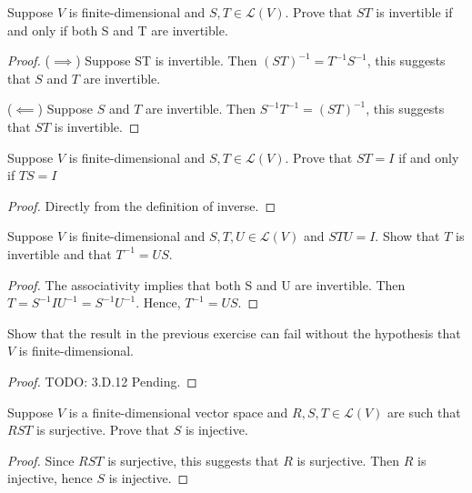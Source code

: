 \begin{exercise}
Suppose $V$ is finite-dimensional and $S,T \in \mathcal{L}(V).$ Prove that $ST $ is invertible if and only if both S and T are invertible.
\end{exercise}
\begin{proof}
	($\implies$) Suppose ST is invertible. Then $(ST)^{-1} = T^{-1}S^{-1}$, this suggests that $S$ and $T$ are invertible.

	($\impliedby$) Suppose $S$ and $T$ are invertible. Then $S^{-1}T^{-1} = (ST)^{-1}$, this suggests that $ST$ is invertible.
\end{proof}

\begin{exercise}
Suppose $V$ is finite-dimensional and $S,T \in \mathcal{L}(V)$. Prove that $ST = I$ if and only if $TS = I$
\end{exercise}
\begin{proof}
	Directly from the definition of inverse.
\end{proof}

\begin{exercise}
Suppose $V$ is finite-dimensional and $S,T,U \in \mathcal{L}(V)$ and $STU = I.$ Show that $T $ is invertible and that $T^{-1} = US$.
\end{exercise}
\begin{proof}
	The associativity implies that both S and U are invertible. Then $T = S^{-1}I U^{-1} = S^{-1} U^{-1}$. Hence, $T^{-1} = US$.
\end{proof}

\begin{exercise}
Show that the result in the previous exercise can fail without the hypothesis that $V$ is finite-dimensional.
\end{exercise}
\begin{proof}
	TODO: 3.D.12 Pending.
\end{proof}

\begin{exercise}
Suppose $V$ is a finite-dimensional vector space and $R,S,T \in \mathcal{L}(V)$ are such that $RST$ is surjective. Prove that $S$ is injective.
\end{exercise}
\begin{proof}
	Since $RST$ is surjective, this suggests that $R$ is surjective. Then $R$ is injective, hence $S$ is injective.
\end{proof}

